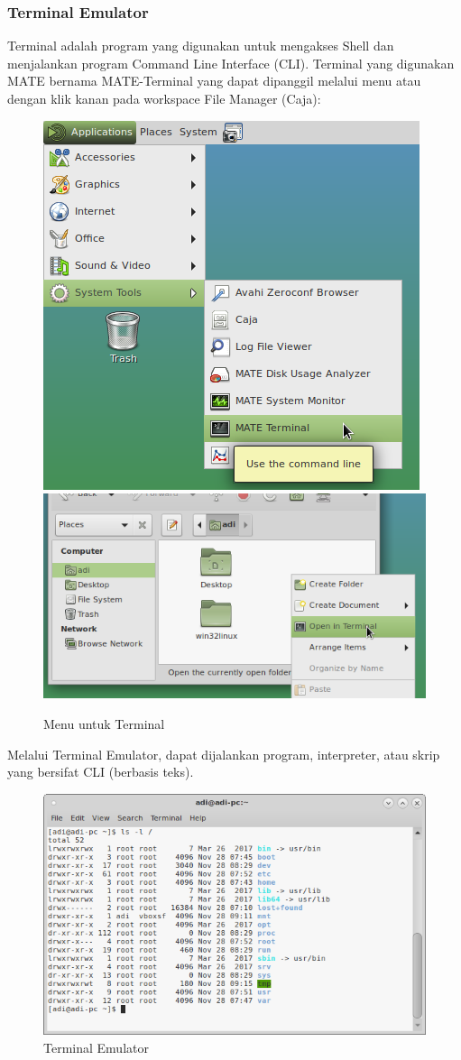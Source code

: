 \documentclass[12pt,]{article}
\begin{document}
	\subsubsection{Terminal Emulator}
	Terminal adalah program yang digunakan untuk mengakses Shell dan menjalankan program Command Line Interface (CLI).
	Terminal yang digunakan MATE bernama MATE-Terminal yang dapat dipanggil melalui menu atau dengan klik kanan pada workspace File Manager (Caja):
	\begin{figure}[H]
		\centering
		\includegraphics[width=0.4\linewidth]{images/mateapp/terminal1}
		\includegraphics[width=0.4\linewidth]{images/mateapp/terminal2}
		\caption{Menu untuk Terminal}
	\end{figure}

	Melalui Terminal Emulator, dapat dijalankan program, interpreter, atau skrip yang bersifat CLI (berbasis teks).
	\begin{figure}[H]
		\centering
		\includegraphics[width=0.8\linewidth]{images/mateapp/terminal3}
		\caption{Terminal Emulator}
	\end{figure}
\end{document}
